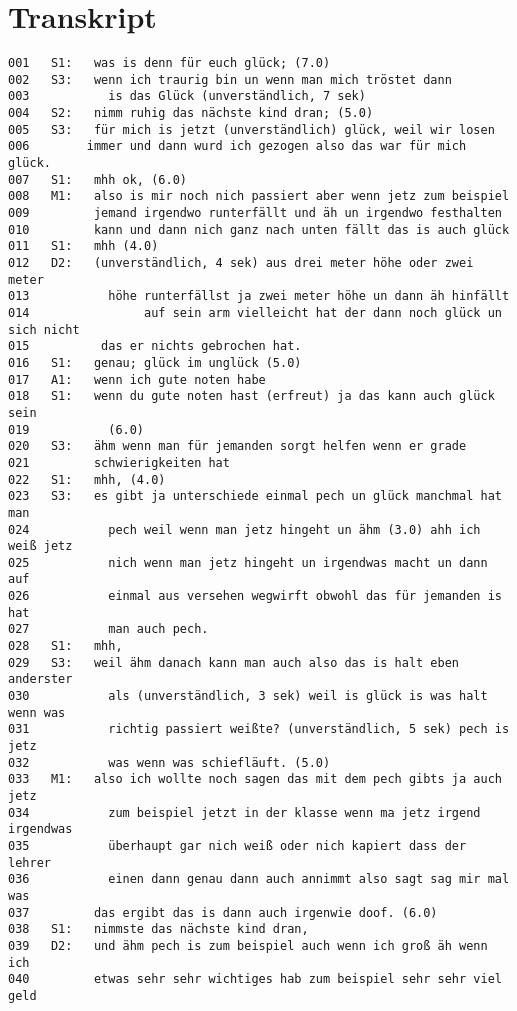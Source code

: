 \section{Transkript}

\begin{lstlisting}[language={}]
001   S1:   was is denn für euch glück; (7.0)
002   S3:   wenn ich traurig bin un wenn man mich tröstet dann  
003           is das Glück (unverständlich, 7 sek)
004   S2:   nimm ruhig das nächste kind dran; (5.0)   
005   S3:   für mich is jetzt (unverständlich) glück, weil wir losen
006        immer und dann wurd ich gezogen also das war für mich glück. 
007   S1:   mhh ok, (6.0)
008   M1:   also is mir noch nich passiert aber wenn jetz zum beispiel 
009         jemand irgendwo runterfällt und äh un irgendwo festhalten
010         kann und dann nich ganz nach unten fällt das is auch glück
011   S1:   mhh (4.0)
012   D2:   (unverständlich, 4 sek) aus drei meter höhe oder zwei meter 
013           höhe runterfällst ja zwei meter höhe un dann äh hinfällt
014                auf sein arm vielleicht hat der dann noch glück un sich nicht
015          das er nichts gebrochen hat.
016   S1:   genau; glück im unglück (5.0)
017   A1:   wenn ich gute noten habe
018   S1:   wenn du gute noten hast (erfreut) ja das kann auch glück sein 
019           (6.0)
020   S3:   ähm wenn man für jemanden sorgt helfen wenn er grade 
021         schwierigkeiten hat
022   S1:   mhh, (4.0)
023   S3:   es gibt ja unterschiede einmal pech un glück manchmal hat man 
024           pech weil wenn man jetz hingeht un ähm (3.0) ahh ich weiß jetz 
025           nich wenn man jetz hingeht un irgendwas macht un dann auf 
026           einmal aus versehen wegwirft obwohl das für jemanden is hat 
027           man auch pech.
028   S1:   mhh,
029   S3:   weil ähm danach kann man auch also das is halt eben anderster 
030           als (unverständlich, 3 sek) weil is glück is was halt wenn was 
031           richtig passiert weißte? (unverständlich, 5 sek) pech is jetz 
032           was wenn was schiefläuft. (5.0)
033   M1:   also ich wollte noch sagen das mit dem pech gibts ja auch jetz 
034           zum beispiel jetzt in der klasse wenn ma jetz irgend irgendwas 
035           überhaupt gar nich weiß oder nich kapiert dass der lehrer 
036           einen dann genau dann auch annimmt also sagt sag mir mal was 
037         das ergibt das is dann auch irgenwie doof. (6.0)
038   S1:   nimmste das nächste kind dran,
039   D2:   und ähm pech is zum beispiel auch wenn ich groß äh wenn ich   
040         etwas sehr sehr wichtiges hab zum beispiel sehr sehr viel geld 

\end{lstlisting}
